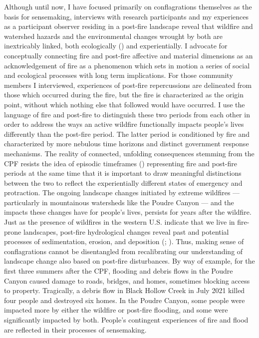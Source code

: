 \documentclass[
]{article}
\begin{document}
Although until now, I have focused primarily on conflagrations themselves as the basis for sensemaking, interviews with research participants and my experiences as a participant observer residing in a post-fire landscape reveal that wildfire and watershed hazards and the environmental changes wrought by both are inextricably linked, both ecologically () and experientially. I advocate for conceptually connecting fire and post-fire affective and material dimensions as an acknowledgement of fire as a phenomenon which sets in motion a series of social and ecological processes with long term implications. For those community members I interviewed, experiences of post-fire repercussions are delineated from those which occurred during the fire, but the fire is characterized as the origin point, without which nothing else that followed would have occurred. I use the language of fire and post-fire to distinguish these two periods from each other in order to address the ways an active wildfire functionally impacts people's lives differently than the post-fire period. The latter period is conditioned by fire and characterized by more nebulous time horizons and distinct government response mechanisms. The reality of connected, unfolding consequences stemming from the CPF resists the idea of episodic timeframes () representing fire and post-fire periods at the same time that it is important to draw meaningful distinctions between the two to reflect the experientially different states of emergency and protraction. The ongoing landscape changes initiated by extreme wildfires --- particularly in mountainous watersheds like the Poudre Canyon --- and the impacts these changes have for people's lives, persists for years after the wildfire. Just as the presence of wildfires in the western U.S. indicate that we live in fire-prone landscapes, post-fire hydrological changes reveal past and potential processes of sedimentation, erosion, and deposition (; ). Thus, making sense of conflagrations cannot be disentangled from recalibrating our understanding of landscape change also based on post-fire disturbances. By way of example, for the first three summers after the CPF, flooding and debris flows in the Poudre Canyon caused damage to roads, bridges, and homes, sometimes blocking access to property. Tragically, a debris flow in Black Hollow Creek in July 2021 killed four people and destroyed six homes. In the Poudre Canyon, some people were impacted more by either the wildfire or post-fire flooding, and some were significantly impacted by both. People's contingent experiences of fire and flood are reflected in their processes of sensemaking.
\end{document}
